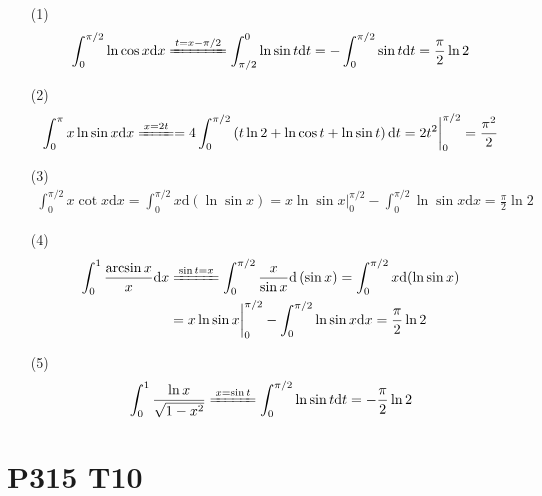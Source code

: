 \documentclass{article}
\newcommand{\dd}{\mathrm{d}}
\newcommand{\dx}{\dd x}
\newcommand{\dt}{\dd t}
\begin{document}
\begin{itemize}
    \item [(1)] 
    \begin{align*}
        \int_{0}^{\pi/2}\ln \cos x \dx \xlongequal{t = x - \pi/2} \int_{\pi/2}^{0}\ln \sin t \dt = -\int_{0}^{\pi/2}\sin t \dt = \frac{\pi}{2}\ln 2
    \end{align*}
    \item [(2)]
    \begin{align*}
        \int_{0}^{\pi}x\ln \sin x \dx \xlongequal{x = 2t} = 4\int_{0}^{\pi/2}\left(t \ln 2 + \ln \cos t + \ln \sin t\right) \dt = 2t^2\bigg|_0^{\pi/2} = \frac{\pi^2}{2}
    \end{align*}
    \item [(3)]
    \begin{align*}
        \int_{0}^{\pi/2}x \cot x\dx = \int_{0}^{\pi/2}x \dd \left(\ln \sin x\right) = x \ln \sin x \bigg|_0^{\pi/2} - \int_{0}^{\pi/2}\ln \sin x \dx = \frac{\pi}{2}\ln 2
    \end{align*}
    \item [(4)]
    \begin{align*}
        \int_{0}^{1}\frac{\arcsin x}{x}\dx &\xlongequal{\sin t = x} \int_{0}^{\pi/2}\frac{x}{\sin x}\dd \left(\sin x\right) = \int_{0}^{\pi/2}x \dd (\ln \sin x) \\
        &= x \ln \sin x \bigg|_0^{\pi/2} - \int_{0}^{\pi/2}\ln \sin x \dx = \frac{\pi}{2}\ln 2 
    \end{align*}
    \item [(5)]
    \begin{align*}
        \int_{0}^{1}\frac{\ln x}{\sqrt{1 - x^2}} \xlongequal{x = \sin t} \int_{0}^{\pi/2}\ln \sin t \dt = -\frac{\pi}{2}\ln 2
    \end{align*}
\end{itemize}

\section*{P315 T10}
\end{document}
